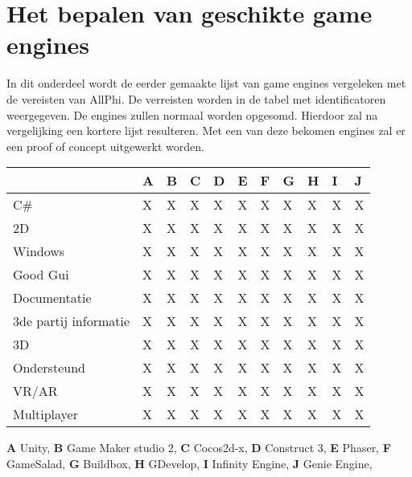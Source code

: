 \section{Het bepalen van geschikte game engines}
In dit onderdeel wordt de eerder gemaakte lijst van game engines vergeleken met de vereisten van AllPhi. De verreisten worden in de tabel met identificatoren weergegeven. De engines zullen normaal worden opgesomd. Hierdoor zal na vergelijking een kortere lijst resulteren. Met een van deze bekomen engines zal er een proof of concept uitgewerkt worden.
\\
\begin{center}
\begin{tabular}{ | m{8em} | m{1cm}| m{1cm} |m{1cm}| m{1cm}| m{1cm} |m{1cm}| m{1cm} |m{1cm}| m{1cm} | m{1cm} | } 
    \hline
     & A & B & C & D & E & F & G & H & I & J\\
    \hline
    C\# & X & X & X & X & X & X & X & X & X & X \\ 
    \hline
    2D & X & X & X & X & X & X & X & X & X & X \\ 
    \hline
    Windows & X & X & X & X & X & X & X & X & X & X \\ 
    \hline
    Good Gui & X & X & X & X & X & X & X & X & X & X \\ 
    \hline
    Documentatie & X & X & X & X & X & X & X & X & X & X \\ 
    \hline
    3de partij informatie & X & X & X & X & X & X & X & X & X & X \\ 
    \hline
    3D & X & X & X & X & X & X & X & X & X & X \\ 
    \hline
    Ondersteund & X & X & X & X & X & X & X & X & X & X \\ 
    \hline
    VR/AR & X & X & X & X & X & X & X & X & X & X \\ 
    \hline
    Multiplayer & X & X & X & X & X & X & X & X & X & X \\ 
    \hline
\end{tabular}
\end{center}
\textbf{A} Unity,
\textbf{B} Game Maker studio 2,
\textbf{C} Cocos2d-x,
\textbf{D} Construct 3,
\textbf{E} Phaser,
\textbf{F} GameSalad,
\textbf{G} Buildbox,
\textbf{H} GDevelop,
\textbf{I} Infinity Engine,
\textbf{J} Genie Engine,
